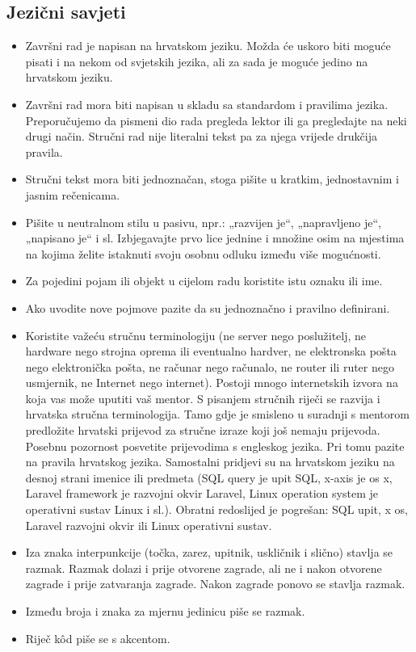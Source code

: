 \subsection{Jezični savjeti}
\begin{itemize}
\item 
Završni rad je napisan na hrvatskom jeziku. Možda će uskoro biti moguće pisati i na nekom od svjetskih jezika, ali za sada je moguće jedino na hrvatskom jeziku.
\item Završni rad mora biti napisan u skladu sa standardom i pravilima jezika. Preporučujemo da pismeni dio rada pregleda lektor ili ga pregledajte na neki drugi način. Stručni rad nije literalni tekst pa za njega vrijede drukčija pravila.
\item Stručni tekst mora biti jednoznačan, stoga pišite u kratkim, jednostavnim i jasnim rečenicama.
\item Pišite u neutralnom stilu u pasivu, npr.: „razvijen je“, „napravljeno je“, „napisano je“ i sl. Izbjegavajte prvo lice jednine i množine osim na mjestima na kojima želite istaknuti svoju osobnu odluku između više mogućnosti. 
\item Za pojedini pojam ili objekt u cijelom radu koristite istu oznaku ili ime.
\item Ako uvodite nove pojmove pazite da su jednoznačno i pravilno definirani.
\item Koristite važeću stručnu terminologiju (ne server nego poslužitelj, ne hardware nego strojna oprema ili eventualno hardver, ne elektronska pošta nego elektronička pošta, ne računar nego računalo, ne router ili ruter nego usmjernik, ne Internet nego internet). Postoji mnogo internetskih izvora na koja vas može uputiti vaš mentor.
S pisanjem stručnih riječi se razvija i hrvatska stručna terminologija. Tamo gdje je smisleno u suradnji s mentorom predložite hrvatski prijevod za stručne izraze koji još nemaju prijevoda.
Posebnu pozornost posvetite prijevodima s engleskog jezika. Pri tomu pazite na pravila hrvatskog jezika. Samostalni pridjevi su na hrvatskom jeziku na desnoj strani imenice ili predmeta (SQL query je upit SQL, x-axis je os x, Laravel framework je razvojni okvir Laravel, Linux operation system je operativni sustav Linux i sl.). Obratni redoslijed je pogrešan: SQL upit, x os, Laravel razvojni okvir ili Linux operativni sustav.

\item Iza znaka interpunkcije (točka, zarez, upitnik, uskličnik i slično) stavlja se razmak. Razmak dolazi i prije otvorene zagrade, ali ne i nakon otvorene zagrade i prije zatvaranja zagrade. 
Nakon zagrade ponovo se stavlja razmak.

\item Između broja i znaka za mjernu jedinicu piše se razmak.

\item Riječ k\^od piše se s akcentom.                               
\end{itemize}
